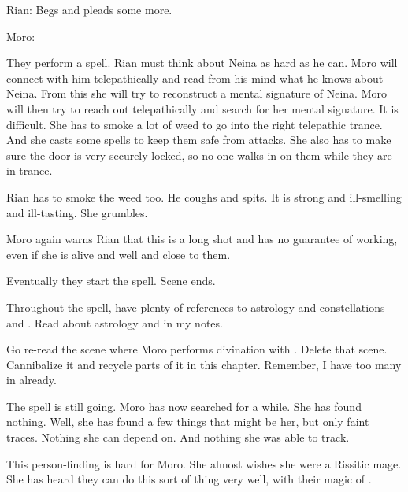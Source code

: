 Rian:
Begs and pleads some more.

Moro:
  

They perform a spell. 
Rian must think about Neina as hard as he can. 
Moro will connect with him telepathically and read from his mind what he knows about Neina. 
From this she will try to reconstruct a mental signature of Neina. 
Moro will then try to reach out telepathically and search for her mental signature. 
It is difficult.
She has to smoke a lot of weed to go into the right telepathic trance. 
And she casts some spells to keep them safe from attacks. 
She also has to make sure the door is very securely locked, so no one walks in on them while they are in trance. 

Rian has to smoke the weed too.
He coughs and spits. 
It is strong and ill-smelling and ill-tasting. 
She grumbles.

Moro again warns Rian that this is a long shot and has no guarantee of working, even if she is alive and well and close to them. 

Eventually they start the spell. 
Scene ends.

Throughout the spell, have plenty of references to astrology and constellations and \vertices. 
Read about astrology and \vertices in my notes.

Go re-read the scene where Moro performs divination with \Tiroco.
Delete that scene. 
Cannibalize it and recycle parts of it in this chapter. 
Remember, I have too many  in \Malcur already.




\begin{comment}
  \section{Moro searches the afterlife}
\end{comment}
\new
The spell is still going. 
Moro has now searched for a while. 
She has found nothing. 
Well, she has found a few things that might be her, but only faint traces.
Nothing she can depend on.
And nothing she was able to track. 

This person-finding is hard for Moro.
She almost wishes she were a Rissitic mage. 
She has heard they can do this sort of thing very well, with their magic of . 

